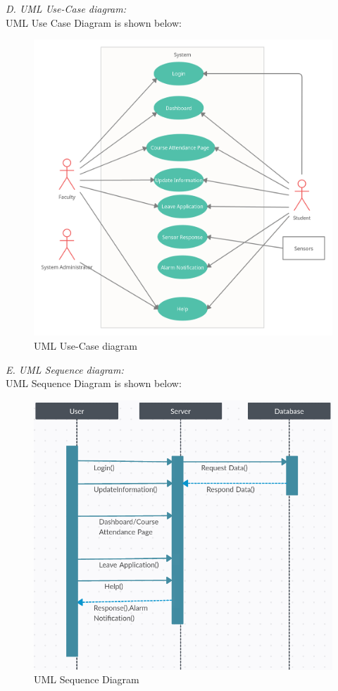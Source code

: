 \documentclass[conference]{IEEEtran}
\begin{document}
\emph {D. UML Use-Case diagram:}\\
UML Use Case Diagram is shown below:

\begin{figure}[htbp]
\centerline{\includegraphics[scale=0.15]{UMLUsecase.png}}
\caption{UML Use-Case diagram}
\label{fig}
\end{figure}

\emph {E. UML Sequence diagram:}\\
UML Sequence Diagram is shown below:
\begin{figure}[htbp]
\centerline{\includegraphics[scale=0.3]{UMLSequence.png}}
\caption{UML Sequence Diagram}
\label{fig}
\end{figure}\\
\end{document}
